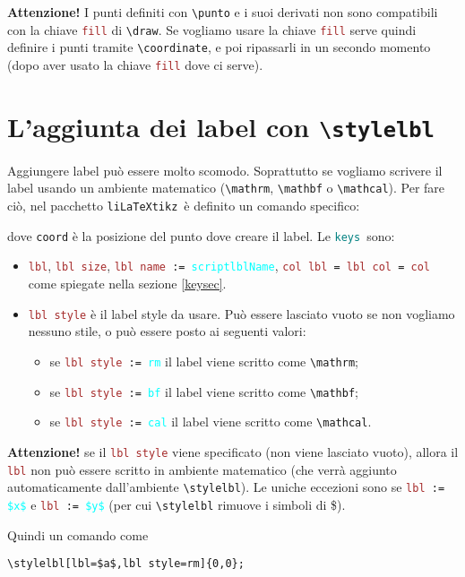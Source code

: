 \documentclass[italian, a4paper]{article}
\newcommand{\bs}{\textbackslash}
\newcommand{\ttt}[1]{\texttt{#1}}
\newcommand{\liLaTeXtikz}{\ttt{liLaTeXtikz}}
\newcommand{\codice}[2][\large]{\vspace*{1mm}\noindent\fbox{\parbox{\textwidth}{#1\ttt{#2}}}}
\newcommand{\blue}[1]{\textcolor{blue}{#1}}
\newcommand{\cyan}[1]{\textcolor{cyan}{#1}}
\newcommand{\keys}{\textcolor{teal}{\ttt{keys}}}
\newcommand{\key}[1]{\textcolor{brown}{\ttt{#1}}}
\newcommand{\keyval}[1]{\cyan{\ttt{#1}}}
\begin{document}
\textbf{Attenzione!} I punti definiti con \ttt{\bs punto} e i suoi derivati non sono compatibili con la chiave \key{fill} di \ttt{\bs draw}. Se vogliamo usare la chiave \key{fill} serve quindi definire i punti tramite \ttt{\bs coordinate}, e poi ripassarli in un secondo momento (dopo aver usato la chiave \key{fill} dove ci serve).

\newpage
\section{L'aggiunta dei label con \ttt{\bs stylelbl}}
Aggiungere label può essere molto scomodo. Soprattutto se vogliamo scrivere il label usando un ambiente matematico (\ttt{\bs mathrm}, \ttt{\bs mathbf} o \ttt{\bs mathcal}). Per fare ciò, nel pacchetto \liLaTeXtikz\ è definito un comando specifico:

\codice{\bs stylelbl[\keys]\{\blue{posizione}\};}
dove \ttt{coord} è la posizione del punto dove creare il label. Le \keys\ sono:
\begin{itemize}[nolistsep]
\item \key{lbl}, \key{lbl size}, \ttt{\key{lbl name} := \keyval{scriptlblName}}, \ttt{\key{col lbl} = \key{lbl col} = \key{col}} come spiegate nella sezione \ref{keysec}.
\item \key{lbl style} è il label style da usare. Può essere lasciato vuoto se non vogliamo nessuno stile, o può essere posto ai seguenti valori:
\begin{itemize}[nolistsep]
\item se \ttt{\key{lbl style} := \keyval{rm}} il label viene scritto come \ttt{\bs mathrm};
\item se \ttt{\key{lbl style} := \keyval{bf}} il label viene scritto come \ttt{\bs mathbf};
\item se \ttt{\key{lbl style} := \keyval{cal}} il label viene scritto come \ttt{\bs mathcal}.
\end{itemize}
\end{itemize}
\textbf{Attenzione!} se il \key{lbl style} viene specificato (non viene lasciato vuoto), allora il \key{lbl} non può essere scritto in ambiente matematico (che verrà aggiunto automaticamente dall'ambiente \ttt{\bs stylelbl}). Le uniche eccezioni sono se \ttt{\key{lbl} := \keyval{\$x\$}} e \ttt{\key{lbl} := \keyval{\$y\$}} (per cui \ttt{\bs stylelbl} rimuove i simboli di \$).

Quindi un comando come

\ttt{\bs stylelbl[lbl=\$a\$,lbl style=rm]\{0,0\};}
\end{document}
